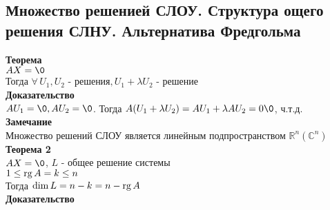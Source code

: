 \documentclass[12pt]{article}
\begin{document}
\subsection{Множество решенией СЛОУ. Структура ощего решения СЛНУ. Альтернатива Фредгольма}
\textbf{Теорема}\\
$AX = \0$\\
Тогда $\forall\,U_1,U_2$ - решения$, U_1+\lambda U_2$ - решение\\
\textbf{Доказательство}\\
$AU_1 = \0, AU_2 = \0$. Тогда $A(U_1+\lambda U_2) = AU_1 + \lambda AU_2 = 0\0$, ч.т.д.\\
\textbf{Замечание}\\
Множество решений СЛОУ является линейным подпространством $\mathbb{R}^n(\mathbb{C}^n)$\\
\textbf{Теорема 2}\\
$AX=\0$, $L$ - общее решение системы\\
$1 \leq \operatorname{rg} A = k \leq n$\\
Тогда $ \dim L = n-k = n-\operatorname{rg} A$\\
\textbf{Доказательство}
\end{document}
